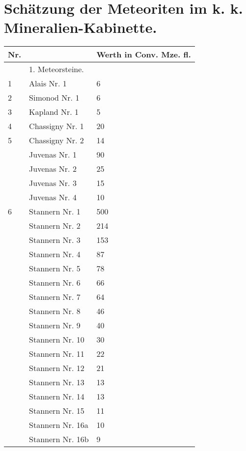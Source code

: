 \documentclass[a4paper, 11pt, oneside, polutonikogreek, german]{article}
\begin{document}
\section{Schätzung der Meteoriten im k. k. Mineralien-Kabinette.}
\begin{center}
    \begin{longtable}{|l|l|l|}
    \hline
        Nr. &   & Werth in Conv. Mze. fl. \\ \hline
          & 1. Meteorsteine. &   \\ \hline
        1 & Alais Nr. 1 & 6 \\ \hline
        2 & Simonod Nr. 1 & 6 \\ \hline
        3 & Kapland Nr. 1 & 5 \\ \hline
        4 & Chassigny Nr. 1 & 20 \\ \hline
        5 & Chassigny Nr. 2 & 14 \\ \hline
          & Juvenas Nr. 1 & 90 \\ \hline
          & Juvenas Nr. 2 & 25 \\ \hline
          & Juvenas Nr. 3 & 15 \\ \hline
          & Juvenas Nr. 4 & 10 \\ \hline
        6 & Stannern Nr. 1 & 500 \\ \hline
          & Stannern Nr. 2 & 214 \\ \hline
          & Stannern Nr. 3 & 153 \\ \hline
          & Stannern Nr. 4 & 87 \\ \hline
          & Stannern Nr. 5 & 78 \\ \hline
          & Stannern Nr. 6 & 66 \\ \hline
          & Stannern Nr. 7 & 64 \\ \hline
          & Stannern Nr. 8 & 46 \\ \hline
          & Stannern Nr. 9 & 40 \\ \hline
          & Stannern Nr. 10 & 30 \\ \hline
          & Stannern Nr. 11 & 22 \\ \hline
          & Stannern Nr. 12 & 21 \\ \hline
          & Stannern Nr. 13 & 13 \\ \hline
          & Stannern Nr. 14 & 13 \\ \hline
          & Stannern Nr. 15 & 11 \\ \hline
          & Stannern Nr. 16a & 10 \\ \hline
          & Stannern Nr. 16b & 9 \\ \hline

\end{longtable}
\end{center}
\end{document}

